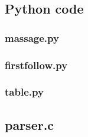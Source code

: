 \documentclass[titlepage]{article}
\begin{document}
		\subsection{Python code}
			\subsubsection{massage.py}
			
			\subsubsection{firstfollow.py}
			
			\subsubsection{table.py}
			
		\else
		\subsection{parser.c}
		
		\fi
\end{document}
